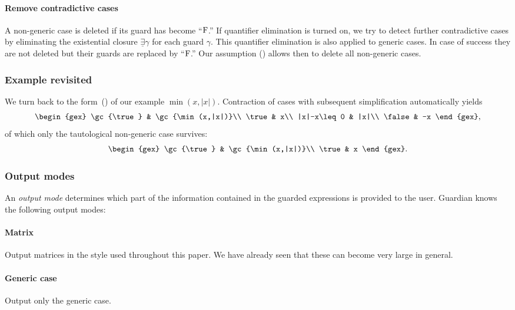 \paragraph{Remove contradictive cases} A non-generic case is  deleted if
its guard has become ``$\textrm{F}$.'' If quantifier elimination is turned
on, we try to detect further contradictive cases by eliminating the
existential closure $\underline\exists\gamma$ for each guard $\gamma$.
This quantifier elimination is also applied to generic cases. In case
of success they are not deleted but their guards are replaced by
``$\textrm{F}$.'' Our assumption () allows then to
delete all non-generic cases.

\subsubsection{Example revisited}
We turn back to the form~() of our example $\min(x,|x|)$.
Contraction of cases with subsequent simplification automatically
yields
\[
\begin{gex}
\gc{\true} & \gc{\min(x,|x|)}\\
\true & x\\
|x|-x\leq 0 & |x|\\
\false & -x
\end{gex},
\]
of which only the tautological non-generic case survives:
\begin{equation}
\begin{gex}
\gc{\true} & \gc{\min(x,|x|)}\\
\true & x
\end{gex}.\label{minabs}
\end{equation}

\subsubsection{Output modes}
An {\em output mode} determines which part of the information
contained in the guarded expressions is provided to the user. {\sc
Guardian} knows the following output modes:

\paragraph{Matrix} Output matrices in the style used throughout this
paper. We have already seen that these can become very large in
general.
\paragraph{Generic case} Output only the generic case.
